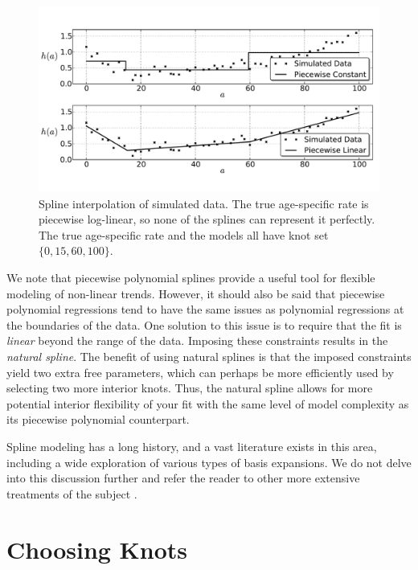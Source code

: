 \begin{figure}[h]
\begin{center}
\includegraphics[width=\textwidth]{splines-fig.pdf}
\caption{Spline interpolation of simulated data. The true age-specific
  rate is piecewise log-linear, so none of the splines can represent
  it perfectly. The true age-specific rate and the models all have
  knot set $\{0, 15, 60, 100\}$.}
\label{splines_fig}
\end{center}
\end{figure}

We note that piecewise polynomial splines provide a useful tool for
flexible modeling of non-linear trends. However, it should also be
said that piecewise polynomial regressions tend to have the same
issues as polynomial regressions at the boundaries of the data. One
solution to this issue is to require that the fit is \emph{linear}
beyond the range of the data. Imposing these constraints results in
the \emph{natural spline}. The benefit of using natural splines is
that the imposed constraints yield two extra free parameters, which
can perhaps be more efficiently used by selecting two more interior
knots. Thus, the natural spline allows for more potential interior
flexibility of your fit with the same level of model complexity as its
piecewise polynomial counterpart.

Spline modeling has a long history, and a vast literature exists in
this area, including a wide exploration of various types of basis
expansions. We do not delve into this discussion further and refer the
reader to other more extensive treatments of the subject
\cite{Wahba_Spline_1990,ESL}.

\section{Choosing Knots}

